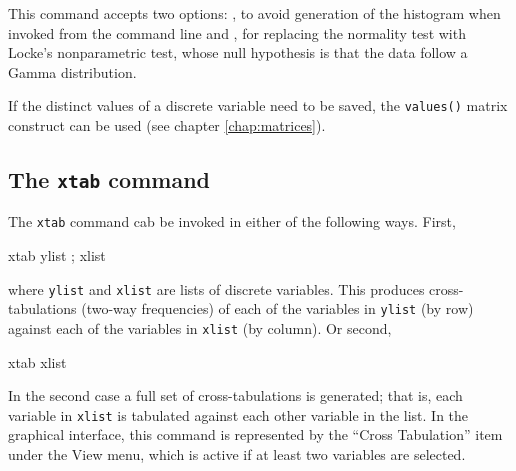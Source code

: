 This command accepts two options: , to avoid
generation of the histogram when invoked from the command line and
, for replacing the normality test with Locke's
nonparametric test, whose null hypothesis is that the data follow a
Gamma distribution.

If the distinct values of a discrete variable need to be saved, the
\texttt{values()} matrix construct can be used (see chapter
\ref{chap:matrices}).

\subsection{The \texttt{xtab} command}
\label{discr-xtab}

The \texttt{xtab} command cab be invoked in either of the following
ways.  First,
%
\begin{code}
xtab ylist ; xlist
\end{code}
%
where \texttt{ylist} and \texttt{xlist} are lists of discrete
variables.  This produces cross-tabulations (two-way frequencies) of
each of the variables in \texttt{ylist} (by row) against each of the
variables in \texttt{xlist} (by column).  Or second,
%
\begin{code}
xtab xlist
\end{code}
%
In the second case a full set of cross-tabulations is generated; that
is, each variable in \texttt{xlist} is tabulated against each other
variable in the list.  In the graphical interface, this command is
represented by the ``Cross Tabulation'' item under the View menu,
which is active if at least two variables are selected.

